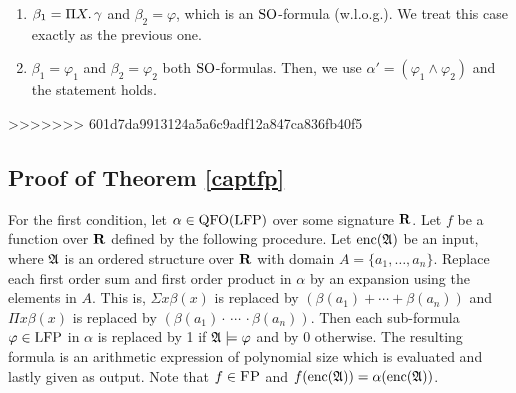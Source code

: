 \begin{enumerate}
\begin{enumerate}
		\item $\beta_1 = \Pi{X}.\, \gamma$ and $\beta_2 = \varphi$, which is an ${\rm SO}$-formula (w.l.o.g.). We treat this case exactly as the previous one.

		\item $\beta_1 = \varphi_1$ and $\beta_2 = \varphi_2$ both ${\rm SO}$-formulas. Then, we use $\alpha' = (\varphi_1 \wedge \varphi_2)$ and the statement holds.

	\end{enumerate}

\end{enumerate}

>>>>>>> 601d7da9913124a5a6c9adf12a847ca836fb40f5



\subsection{Proof of Theorem \ref{captfp}}

For the first condition, let $\alpha\in{\rm QFO}({\rm LFP})$ over some signature $\mathbf{R}$. Let $f$ be a function over $\mathbf{R}$ defined by the following procedure. Let ${\rm enc}(\mathfrak{A})$ be an input, where $\mathfrak{A}$ is an ordered structure over $\mathbf{R}$ with domain $A = \{a_1,\ldots,a_n\}$. Replace each first order sum and first order product in $\alpha$ by an expansion using the elements in $A$. This is, $\Sigma x \beta(x)$ is replaced by $(\beta(a_1)+\cdots+\beta(a_n))$ and $\Pi x \beta(x)$ is replaced by $(\beta(a_1)\cdot\,\cdots\,\cdot\beta(a_n))$. Then each sub-formula $\varphi\in{\rm LFP}$ in $\alpha$ is replaced by 1 if $\mathfrak{A}\models\varphi$ and by 0 otherwise. The resulting formula is an arithmetic expression of polynomial size which is evaluated and lastly given as output. Note that $f\in\text{\sc FP}$ and $f({\rm enc}(\mathfrak{A})) = \alpha({\rm enc}(\mathfrak{A}))$.
	
